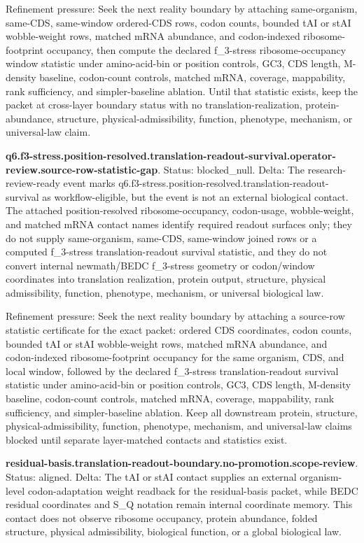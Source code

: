 Refinement pressure: Seek the next reality boundary by attaching same-organism, same-CDS, same-window ordered-CDS rows, codon counts, bounded tAI or stAI wobble-weight rows, matched mRNA abundance, and codon-indexed ribosome-footprint occupancy, then compute the declared f\_3-stress ribosome-occupancy window statistic under amino-acid-bin or position controls, GC3, CDS length, M-density baseline, codon-count controls, matched mRNA, coverage, mappability, rank sufficiency, and simpler-baseline ablation. Until that statistic exists, keep the packet at cross-layer boundary status with no translation-realization, protein-abundance, structure, physical-admissibility, function, phenotype, mechanism, or universal-law claim.

\textbf{q6.f3-stress.position-resolved.translation-readout-survival.operator-review.source-row-statistic-gap}. Status: blocked\_null. Delta: The research-review-ready event marks q6.f3-stress.position-resolved.translation-readout-survival as workflow-eligible, but the event is not an external biological contact. The attached position-resolved ribosome-occupancy, codon-usage, wobble-weight, and matched mRNA contact names identify required readout surfaces only; they do not supply same-organism, same-CDS, same-window joined rows or a computed f\_3-stress translation-readout survival statistic, and they do not convert internal newmath/BEDC f\_3-stress geometry or codon/window coordinates into translation realization, protein output, structure, physical admissibility, function, phenotype, mechanism, or universal biological law.

Refinement pressure: Seek the next reality boundary by attaching a source-row statistic certificate for the exact packet: ordered CDS coordinates, codon counts, bounded tAI or stAI wobble-weight rows, matched mRNA abundance, and codon-indexed ribosome-footprint occupancy for the same organism, CDS, and local window, followed by the declared f\_3-stress translation-readout survival statistic under amino-acid-bin or position controls, GC3, CDS length, M-density baseline, codon-count controls, matched mRNA, coverage, mappability, rank sufficiency, and simpler-baseline ablation. Keep all downstream protein, structure, physical-admissibility, function, phenotype, mechanism, and universal-law claims blocked until separate layer-matched contacts and statistics exist.

\textbf{residual-basis.translation-readout-boundary.no-promotion.scope-review}. Status: aligned. Delta: The tAI or stAI contact supplies an external organism-level codon-adaptation weight readback for the residual-basis packet, while BEDC residual coordinates and S\_Q notation remain internal coordinate memory. This contact does not observe ribosome occupancy, protein abundance, folded structure, physical admissibility, biological function, or a global biological law.

